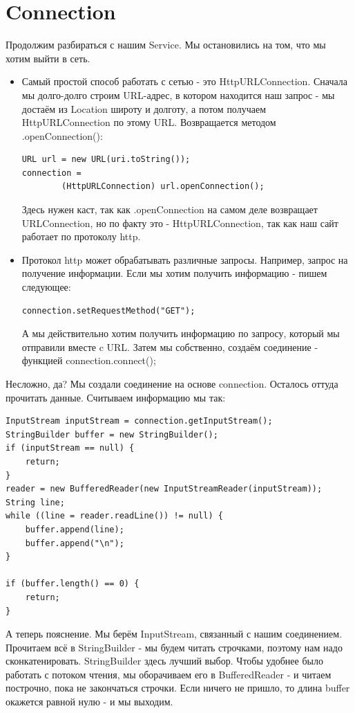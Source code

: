 \documentclass[12 pt]{article}
\begin{document}
\section{Connection}

    Продолжим разбираться с нашим Service. Мы остановились на том, что мы хотим выйти в сеть.
    \begin{itemize}
        \item Самый простой способ работать с сетью - это HttpURLConnection. Сначала мы долго-долго строим URL-адрес, в котором находится наш запрос - мы достаём из Location широту и долготу, а потом получаем HttpURLConnection по этому URL. Возвращается методом .openConnection():
        \begin{lstlisting}
URL url = new URL(uri.toString());
connection = 
        (HttpURLConnection) url.openConnection();
        \end{lstlisting}
        Здесь нужен каст, так как .openConnection на самом деле возвращает URLConnection, но по факту это - HttpURLConnection, так как наш сайт работает по протоколу http.
        \item Протокол http может обрабатывать различные запросы. Например, запрос на получение информации. Если мы хотим получить информацию - пишем следующее:
        \begin{lstlisting}
connection.setRequestMethod("GET");
        \end{lstlisting}
        А мы действительно хотим получить информацию по запросу, который мы отправили вместе c URL.
        Затем мы собственно, создаём соединение - функцией connection.connect();
    \end{itemize}
    Несложно, да? Мы создали соединение на основе connection. Осталось оттуда прочитать данные.
    Считываем информацию мы так:
    \begin{lstlisting}
InputStream inputStream = connection.getInputStream();
StringBuilder buffer = new StringBuilder();
if (inputStream == null) {
    return;
}
reader = new BufferedReader(new InputStreamReader(inputStream));
String line;
while ((line = reader.readLine()) != null) {
    buffer.append(line);
    buffer.append("\n");
}

if (buffer.length() == 0) {
    return;
}
    \end{lstlisting}
    
    А теперь пояснение. Мы берём InputStream, связанный с нашим соединением. Прочитаем всё в StringBuilder - мы будем читать строчками, поэтому нам надо сконкатенировать. StringBuilder здесь лучший выбор. Чтобы удобнее было работать с потоком чтения, мы оборачиваем его в BufferedReader - и читаем построчно, пока не закончаться строчки. Если ничего не пришло, то длина buffer окажется равной нулю - и мы выходим.
    
\end{document}
